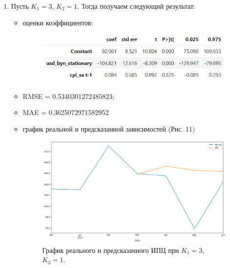 \documentclass[a4paper, 14pt]{extarticle}
\begin{document}
\begin{enumerate}
\begin{itemize}
			
		\end{itemize}
		
			\item Пусть $K_1 = 3$, $K_2 = 1$. Тогда получаем следующий результат:
			\begin{itemize}
				\item оценки коэффициентов:
				\begin{figure}[h!]
					\centering
					\includegraphics[scale=1.1]{images/tab_7}
					\label{fig:tab7}
				\end{figure}
				
				\item RMSE = 0.5340301272485823;
				\item MAE = 0.3625072971582952
				\item график реальной и предсказанной зависимостей (Рис. 11)
				\begin{figure}[tph!]
					\centering
					\includegraphics[scale=0.4]{images/pic_11}
					\caption[Рис. 11]{График реального и предсказанного ИПЦ при $K_1 = 3$, $K_2 = 1$.}
					\label{fig:pic11}
				\end{figure}
			\end{itemize}
		\end{enumerate}
\end{document}
